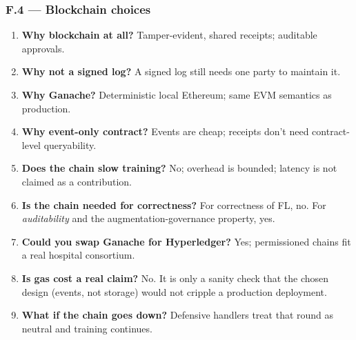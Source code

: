 \documentclass[11pt,a4paper]{article}
\begin{document}
\subsubsection{F.4 --- Blockchain choices}
\begin{enumerate}
\item \textbf{Why blockchain at all?} Tamper-evident, shared receipts; auditable approvals.
\item \textbf{Why not a signed log?} A signed log still needs one party to maintain it.
\item \textbf{Why Ganache?} Deterministic local Ethereum; same EVM semantics as production.
\item \textbf{Why event-only contract?} Events are cheap; receipts don't need contract-level queryability.
\item \textbf{Does the chain slow training?} No; overhead is bounded; latency is not claimed as a contribution.
\item \textbf{Is the chain needed for correctness?} For correctness of FL, no. For \emph{auditability} and the augmentation-governance property, yes.
\item \textbf{Could you swap Ganache for Hyperledger?} Yes; permissioned chains fit a real hospital consortium.
\item \textbf{Is gas cost a real claim?} No. It is only a sanity check that the chosen design (events, not storage) would not cripple a production deployment.
\item \textbf{What if the chain goes down?} Defensive handlers treat that round as neutral and training continues.
\end{enumerate}
\end{document}
